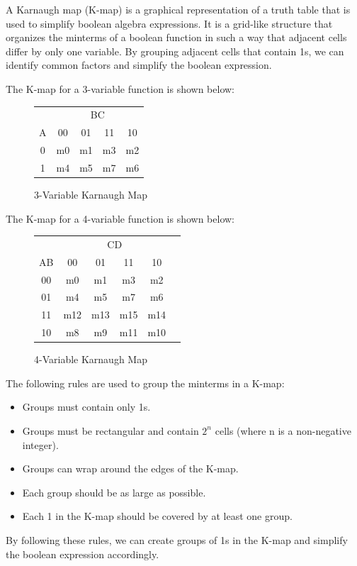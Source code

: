 \documentclass[11pt]{report}
\begin{document}
\begin{definition}
    A Karnaugh map (K-map) is a graphical representation of a truth table that is used to simplify boolean algebra expressions. It is a grid-like structure that organizes the minterms of a boolean function in such a way that adjacent cells differ by only one variable. By grouping adjacent cells that contain 1s, we can identify common factors and simplify the boolean expression.

    The K-map for a 3-variable function is shown below:
    \begin{figure}[h!]
        \centering
        \begin{tabular}{c|c|c|c|c}
            & \multicolumn{4}{c}{BC} \\
            \cline{2-5}
            A & 00 & 01 & 11 & 10 \\
            \hline
            0 & m0 & m1 & m3 & m2 \\
            1 & m4 & m5 & m7 & m6 \\
        \end{tabular}
        \caption{3-Variable Karnaugh Map}
        \label{fig:3_variable_karnaugh_map}
    \end{figure}

    The K-map for a 4-variable function is shown below:
    \begin{figure}[h!]
        \centering
        \begin{tabular}{c|c|c|c|c|c}
            & \multicolumn{4}{c}{CD} \\
            \cline{2-5}
            AB & 00 & 01 & 11 & 10 \\
            \hline
            00 & m0 & m1 & m3 & m2 \\
            01 & m4 & m5 & m7 & m6 \\
            11 & m12 & m13 & m15 & m14 \\
            10 & m8 & m9 & m11 & m10 \\
        \end{tabular}
        \caption{4-Variable Karnaugh Map}
        \label{fig:4_variable_karnaugh_map}
    \end{figure}

    The following rules are used to group the minterms in a K-map:
    \begin{itemize}
        \item Groups must contain only 1s.
        \item Groups must be rectangular and contain $2^n$ cells (where n is a non-negative integer).
        \item Groups can wrap around the edges of the K-map.
        \item Each group should be as large as possible.
        \item Each 1 in the K-map should be covered by at least one group.
    \end{itemize}
    By following these rules, we can create groups of 1s in the K-map and simplify the boolean expression accordingly.
    
\end{definition}
\end{document}
